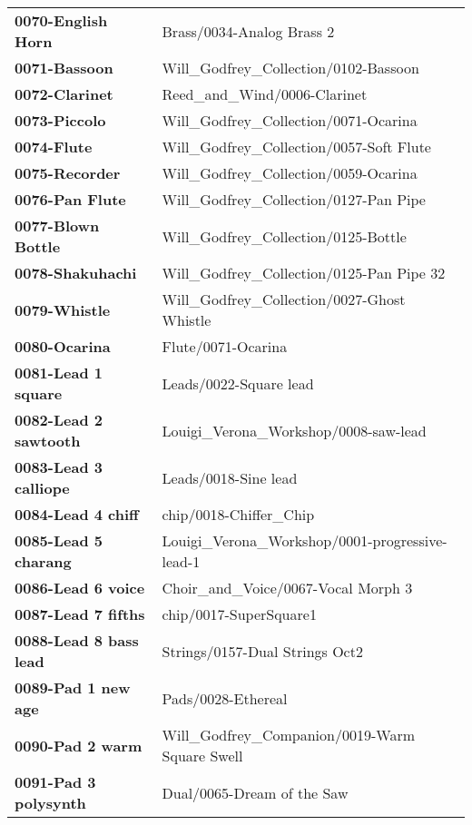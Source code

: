 \begin{longtable}{|l l|}
      \textbf{0070-English Horn} &
         Brass/0034-Analog Brass 2 \\
      \textbf{0071-Bassoon} &
         Will\_Godfrey\_Collection/0102-Bassoon \\
      \textbf{0072-Clarinet} &
         Reed\_and\_Wind/0006-Clarinet \\
      \textbf{0073-Piccolo} &
         Will\_Godfrey\_Collection/0071-Ocarina \\
      \textbf{0074-Flute} &
         Will\_Godfrey\_Collection/0057-Soft Flute \\
      \textbf{0075-Recorder} &
         Will\_Godfrey\_Collection/0059-Ocarina \\
      \textbf{0076-Pan Flute} &
         Will\_Godfrey\_Collection/0127-Pan Pipe \\
      \textbf{0077-Blown Bottle} &
         Will\_Godfrey\_Collection/0125-Bottle \\
      \textbf{0078-Shakuhachi} &
         Will\_Godfrey\_Collection/0125-Pan Pipe 32 \\
      \textbf{0079-Whistle} &
         Will\_Godfrey\_Collection/0027-Ghost Whistle \\
      \textbf{0080-Ocarina} &
         Flute/0071-Ocarina \\
      \textbf{0081-Lead 1 square} &
         Leads/0022-Square lead \\
      \textbf{0082-Lead 2 sawtooth} &
         Louigi\_Verona\_Workshop/0008-saw-lead \\
      \textbf{0083-Lead 3 calliope} &
         Leads/0018-Sine lead \\
      \textbf{0084-Lead 4 chiff} &
         chip/0018-Chiffer\_Chip \\
      \textbf{0085-Lead 5 charang} &
         Louigi\_Verona\_Workshop/0001-progressive-lead-1 \\
      \textbf{0086-Lead 6 voice} &
         Choir\_and\_Voice/0067-Vocal Morph 3 \\
      \textbf{0087-Lead 7 fifths} &
         chip/0017-SuperSquare1 \\
      \textbf{0088-Lead 8 bass lead} &
         Strings/0157-Dual Strings Oct2 \\
      \textbf{0089-Pad 1 new age} &
         Pads/0028-Ethereal \\
      \textbf{0090-Pad 2 warm} &
         Will\_Godfrey\_Companion/0019-Warm Square Swell \\
      \textbf{0091-Pad 3 polysynth} &
         Dual/0065-Dream of the Saw \\

\end{longtable}
